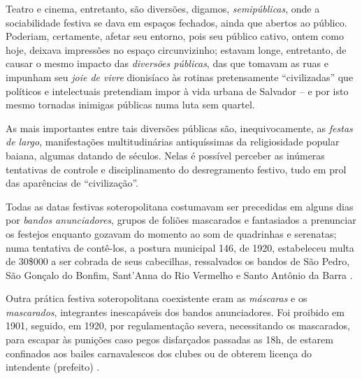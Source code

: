 

Teatro e cinema, entretanto, são diversões, digamos, \textit{semipúblicas}, onde a sociabilidade festiva se dava em espaços fechados, ainda que abertos ao público. Poderiam, certamente, afetar seu entorno, pois seu público cativo, ontem como hoje, deixava impressões no espaço circunvizinho; estavam longe, entretanto, de causar o mesmo impacto das \textit{diversões públicas}, das que tomavam as ruas e impunham seu \textit{joie de vivre} dionisíaco às rotinas pretensamente ``civilizadas'' que políticos e intelectuais pretendiam impor à vida urbana de Salvador -- e por isto mesmo tornadas inimigas públicas numa luta sem quartel.

As mais importantes entre tais diversões públicas são, inequivocamente, as \textit{festas de largo}, manifestações multitudinárias antiquíssimas da religiosidade popular baiana, algumas datando de séculos. Nelas é possível perceber as inúmeras tentativas de controle e disciplinamento do desregramento festivo, tudo em prol das aparências de ``civilização''.

Todas as datas festivas soteropolitana costumavam ser precedidas em alguns dias por \textit{bandos anunciadores}, grupos de foliões mascarados e fantasiados a prenunciar os festejos enquanto gozavam do momento ao som de quadrinhas e serenatas; numa tentativa de contê-los, a postura municipal 146, de 1920, estabeleceu multa de 30\$000 a ser cobrada de seus cabecilhas, ressalvados os bandos de São Pedro, São Gonçalo do Bonfim, Sant’Anna do Rio Vermelho e Santo Antônio da Barra \cite[pp.~42-43]{albuquerque_doisdejulho_1997}. 

Outra prática festiva soteropolitana coexistente eram as \textit{máscaras} e os \textit{mascarados}, integrantes inescapáveis dos bandos anunciadores. Foi proibido em 1901, seguido, em 1920, por regulamentação severa, necessitando os mascarados, para escapar às punições caso pegos disfarçados passadas as 18h, de estarem confinados aos bailes carnavalescos dos clubes ou de obterem licença do intendente (prefeito) \cite[p.~44]{albuquerque_doisdejulho_1997}. 

